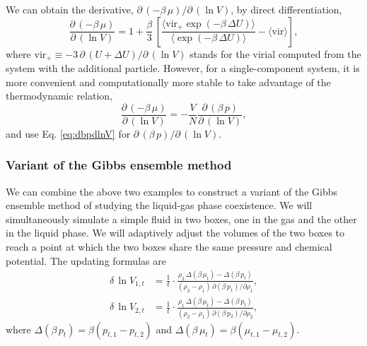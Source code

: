 \documentclass[reprint]{revtex4-1}
\begin{document}
We can obtain the derivative,
$\partial \, (-\beta \, \mu) / \partial \, (\ln V)$,
by direct differentiation,
%
\begin{equation*}
  \frac{ \partial \, (-\beta \, \mu) }
       { \partial \, (\ln V) }
  =
  1 +
  \frac{\beta } { 3 } \,
  \left[
    \frac{ \langle \mathrm{vir}_+ \exp(-\beta \, \Delta U) \rangle }
         { \langle \exp(-\beta \, \Delta U) \rangle }
    -
    \langle \mathrm{vir} \rangle
  \right]
  ,
\end{equation*}
%
where $\mathrm{vir}_+ \equiv -3 \, \partial \, (U + \Delta U) / \partial \, (\ln V)$
stands for the virial
computed from the system with the additional particle.
%
However, for a single-component system,
it is more convenient and computationally more stable
to take advantage of the thermodynamic relation,
\begin{equation*}
  \frac{ \partial \, (-\beta \, \mu) }
       { \partial \, (\ln V) }
  =
  -\frac{V}{N}
  \frac{ \partial \, (\beta \, p) }
       { \partial \, (\ln V) }
  ,
\end{equation*}
%
and use Eq. \eqref{eq:dbpdlnV}
for $\partial \, (\beta\, p)/ \partial \, (\ln V)$.
%


\subsubsection{Variant of the Gibbs ensemble method}


We can combine the above two examples
to construct a variant of the Gibbs ensemble method\cite{frenkel}
of studying the liquid-gas phase coexistence.
%
We will simultaneously simulate a simple fluid
in two boxes, one in the gas and the other in the liquid phase.
%
We will adaptively adjust the volumes of the two boxes
to reach a point at which the two boxes share
the same pressure and chemical potential.
%
The updating formulas are
\begin{align}
  \delta \, \ln V_{1,t}
  &=
  \frac{1}{t} \cdot
  \frac{ \rho_2 \, \Delta( \beta \, \mu_t ) - \Delta( \beta \, p_t ) }
  { (\rho_2 - \rho_1) \, \partial (\beta \, p_1) / \partial \rho_1 }
  ,
  \label{eq:gibbs_p}
  \\
  \delta \, \ln V_{2,t}
  &=
  \frac{1}{t} \cdot
  \frac{ \rho_1 \, \Delta( \beta \, \mu_t ) - \Delta( \beta \, p_t ) }
  { (\rho_2 - \rho_1) \, \partial (\beta \, p_2) / \partial \rho_2 }
  ,
  \label{eq:gibbs_mu}
\end{align}
%
where
$\Delta( \beta \, p_t) = \beta (p_{t,1} - p_{t,2})$
and
$\Delta( \beta \, \mu_t) = \beta (\mu_{t,1} - \mu_{t,2})$.
\end{document}
